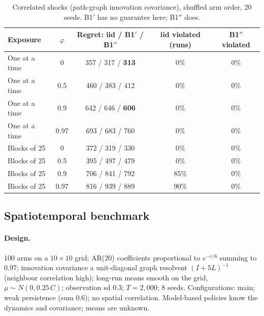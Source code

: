\documentclass[11pt]{article}
\theoremstyle{definition}
\theoremstyle{remark}
\begin{document}
\begin{table}[t]\centering\small
\begin{tabular}{lcccc}
\toprule
Exposure & $\varphi$ & Regret: iid / B1$'$ / B1$''$ & iid violated (runs) & B1$''$ violated \\
\midrule
One at a time & 0 & 357 / 317 / \textbf{313} & 0\% & 0\% \\
One at a time & 0.5 & 460 / 383 / 412 & 0\% & 0\% \\
One at a time & 0.9 & 642 / 646 / \textbf{606} & 0\% & 0\% \\
One at a time & 0.97 & 693 / 683 / 760 & 0\% & 0\% \\
Blocks of 25 & 0 & 372 / 319 / 330 & 0\% & 0\% \\
Blocks of 25 & 0.5 & 395 / 497 / 479 & 0\% & 0\% \\
Blocks of 25 & 0.9 & 706 / 841 / 792 & 85\% & 0\% \\
Blocks of 25 & 0.97 & 816 / 939 / 889 & 90\% & 0\% \\
\bottomrule
\end{tabular}
\caption{Correlated shocks (path-graph innovation covariance), shuffled arm order, 20 seeds. B1$'$ has no guarantee here; B1$''$ does.}\label{tab:b1pp}
\end{table}

\subsection{Spatiotemporal benchmark}

\paragraph{Design.} 100 arms on a $10\times10$ grid; AR(20) coefficients proportional to $e^{-r/6}$ summing to 0.97; innovation covariance a unit-diagonal graph resolvent $(I+5L)^{-1}$ (neighbour correlation high); long-run means smooth on the grid, $\mu\sim N(0,0.25\,C)$; observation sd 0.3; $T=2{,}000$; 8 seeds. Configurations: main; weak persistence (sum 0.6); no spatial correlation. Model-based policies know the dynamics and covariance; means are unknown.
\end{document}
